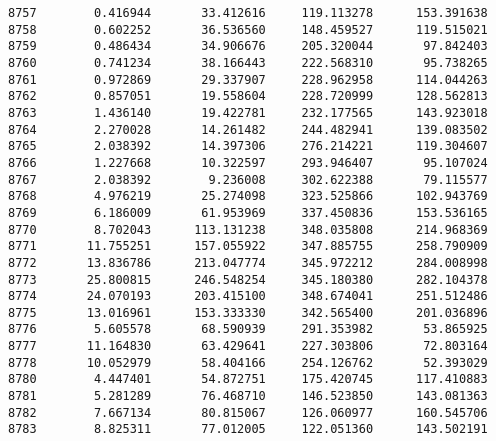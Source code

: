 \documentclass[11pt]{article}
\begin{document}
\begin{Verbatim}[commandchars=\\\{\}]
8757        0.416944       33.412616     119.113278      153.391638   
8758        0.602252       36.536560     148.459527      119.515021   
8759        0.486434       34.906676     205.320044       97.842403   
8760        0.741234       38.166443     222.568310       95.738265   
8761        0.972869       29.337907     228.962958      114.044263   
8762        0.857051       19.558604     228.720999      128.562813   
8763        1.436140       19.422781     232.177565      143.923018   
8764        2.270028       14.261482     244.482941      139.083502   
8765        2.038392       14.397306     276.214221      119.304607   
8766        1.227668       10.322597     293.946407       95.107024   
8767        2.038392        9.236008     302.622388       79.115577   
8768        4.976219       25.274098     323.525866      102.943769   
8769        6.186009       61.953969     337.450836      153.536165   
8770        8.702043      113.131238     348.035808      214.968369   
8771       11.755251      157.055922     347.885755      258.790909   
8772       13.836786      213.047774     345.972212      284.008998   
8773       25.800815      246.548254     345.180380      282.104378   
8774       24.070193      203.415100     348.674041      251.512486   
8775       13.016961      153.333330     342.565400      201.036896   
8776        5.605578       68.590939     291.353982       53.865925   
8777       11.164830       63.429641     227.303806       72.803164   
8778       10.052979       58.404166     254.126762       52.393029   
8780        4.447401       54.872751     175.420745      117.410883   
8781        5.281289       76.468710     146.523850      143.081363   
8782        7.667134       80.815067     126.060977      160.545706   
8783        8.825311       77.012005     122.051360      143.502191   


\end{Verbatim}
\end{document}
